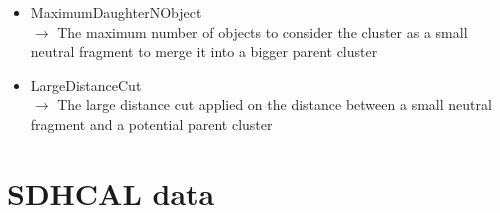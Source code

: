 \documentclass[cits]{JINST}
\begin{document}
\begin{itemize}
  \item MaximumDaughterNObject \\
  $\rightarrow$ The maximum number of objects to consider the cluster as a small neutral fragment to merge it into a bigger parent cluster
  \item LargeDistanceCut \\
  $\rightarrow$ The large distance cut applied on the distance between a small neutral fragment and a potential parent cluster
\end{itemize}



\newpage
\section{SDHCAL data}
\end{document}
